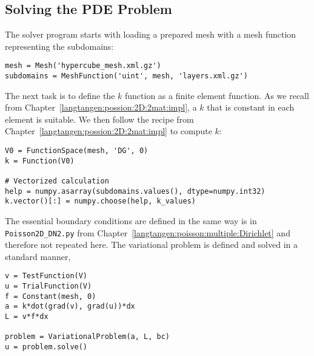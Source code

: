 \subsection{Solving the PDE Problem}
\label{langtangen:possion:nD:nmat:solve}

The solver program starts with loading a prepared mesh with a mesh
function representing the subdomains:
\begin{Verbatim}[fontsize=\fontsize{10pt}{10pt},tabsize=8,baselinestretch=1.05,
fontfamily=tt,xleftmargin=7mm]
mesh = Mesh('hypercube_mesh.xml.gz')
subdomains = MeshFunction('uint', mesh, 'layers.xml.gz')
\end{Verbatim}
\noindent

The next task is to define the $k$ function as a finite element function.
As we recall from Chapter~\ref{langtangen:possion:2D:2mat:impl}, a $k$ that
is constant in each element is suitable.
We then follow the recipe from Chapter~\ref{langtangen:possion:2D:2mat:impl}
to compute $k$:
\begin{Verbatim}[fontsize=\fontsize{10pt}{10pt},tabsize=8,baselinestretch=1.05,
fontfamily=tt,xleftmargin=7mm]
V0 = FunctionSpace(mesh, 'DG', 0)
k = Function(V0)

# Vectorized calculation
help = numpy.asarray(subdomains.values(), dtype=numpy.int32)
k.vector()[:] = numpy.choose(help, k_values)
\end{Verbatim}
\noindent

The essential boundary conditions are defined in the same way is
in {\fontsize{12pt}{12pt}\verb!Poisson2D_DN2.py!} from Chapter~\ref{langtangen:poisson:multiple:Dirichlet}
and therefore not repeated here.
The variational problem is defined and solved in a standard manner,
\begin{Verbatim}[fontsize=\fontsize{10pt}{10pt},tabsize=8,baselinestretch=1.05,
fontfamily=tt,xleftmargin=7mm]
v = TestFunction(V)
u = TrialFunction(V)
f = Constant(mesh, 0)
a = k*dot(grad(v), grad(u))*dx
L = v*f*dx

problem = VariationalProblem(a, L, bc)
u = problem.solve()
\end{Verbatim}
\noindent

